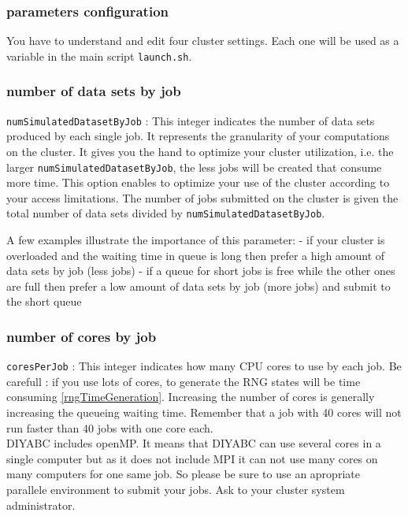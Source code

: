 \subsubsection{parameters configuration}\label{paramconfig}
You have to understand and edit four cluster settings. Each one will be used as a variable in the main script \texttt{launch.sh}.
 

\subsubsection{number of data sets by job}
\texttt{numSimulatedDatasetByJob} : This integer indicates the number of data sets produced by each single job. It represents the granularity of your computations on the cluster. It gives you the hand to optimize your cluster utilization, i.e. the larger \texttt{numSimulatedDatasetByJob}, the less jobs will be created that consume more time. This option enables to optimize your use of the cluster according to your access limitations. The number of jobs submitted on the cluster is given the total number of data sets divided by \texttt{numSimulatedDatasetByJob}. 

A few examples illustrate the importance of this parameter:
- if your cluster is overloaded and the waiting time in queue is long then prefer a high amount of data sets by job (less jobs)
- if a queue for short jobs is free while the other ones are full then prefer a low amount of data sets by job (more jobs) and submit to the short queue

\subsubsection{number of cores by job}
\texttt{coresPerJob} : This integer indicates how many CPU cores to use by each job. Be carefull : if you use lots of cores, to generate the RNG states will be time consuming \ref{rngTimeGeneration}. Increasing the number of cores is generally increasing the queueing waiting time. Remember that a job with 40 cores will not run faster than 40 jobs with one core each. \\
DIYABC includes openMP. It means that DIYABC can use several cores in a single computer but as it does not include MPI it can not use many cores on many computers for one same job. So please be sure to use an apropriate parallele environment to submit your jobs. Ask to your cluster system administrator. 

